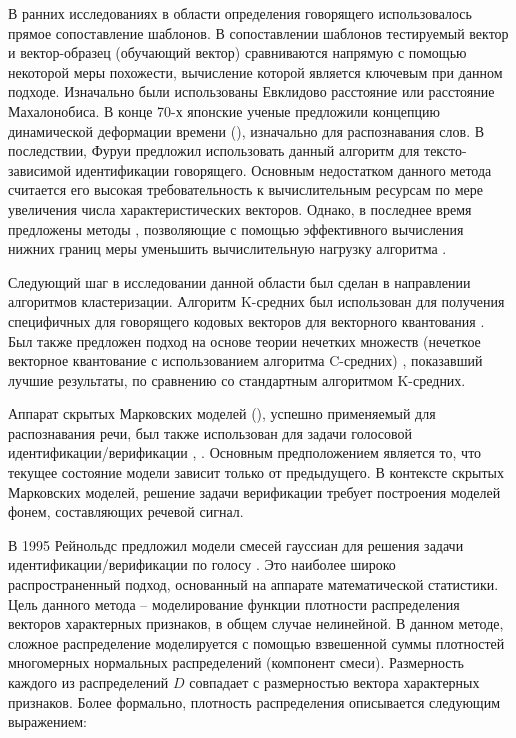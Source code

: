 В ранних исследованиях в области определения говорящего использовалось прямое сопоставление шаблонов. В сопоставлении шаблонов тестируемый вектор и вектор-образец (обучающий вектор) сравниваются напрямую с помощью некоторой меры похожести, вычисление которой является ключевым при данном подходе. Изначально были использованы Евклидово расстояние или расстояние Махалонобиса. В конце 70-х японские ученые предложили \cite{Sakoe78DTW} концепцию динамической деформации времени (), изначально для распознавания слов. В последствии, Фуруи \cite{Furui81cepstral} предложил использовать данный алгоритм для тексто-зависимой идентификации говорящего. Основным недостатком данного метода считается его высокая требовательность к вычислительным ресурсам по мере увеличения числа характеристических векторов. Однако, в последнее время предложены методы \cite{Lemire09dtw}, позволяющие с помощью эффективного вычисления нижних границ меры уменьшить вычислительную нагрузку алгоритма .

Следующий шаг в исследовании данной области был сделан в направлении алгоритмов кластеризации. Алгоритм K-средних был использован для получения специфичных для говорящего кодовых векторов для векторного квантования \cite{Soong85VQ}. Был также предложен подход на основе теории нечетких множеств (нечеткое векторное квантование с использованием алгоритма C-средних) \cite{Bezdek78FVQ}, показавший лучшие результаты, по сравнению со стандартным алгоритмом K-средних.

Аппарат скрытых Марковских моделей (), успешно применяемый для распознавания речи, был также использован для задачи голосовой идентификации/верификации \cite{Olsson02hmmann}, \cite{Falavigna_comparisonof}. Основным предположением является то, что текущее состояние модели зависит только от предыдущего. В контексте скрытых Марковских моделей, решение задачи верификации требует построения моделей фонем, составляющих речевой сигнал.

В 1995 Рейнольдс предложил модели смесей гауссиан для решения задачи идентификации/верификации по голосу \cite{Reynolds95gmm}. Это наиболее широко распространенный подход, основанный на аппарате математической статистики. Цель данного метода -- моделирование функции плотности распределения векторов характерных признаков, в общем случае нелинейной. В данном методе, сложное распределение моделируется с помощью взвешенной суммы плотностей многомерных нормальных распределений (компонент смеси). Размерность каждого из распределений $D$ совпадает с размерностью вектора характерных признаков. Более формально, плотность распределения описывается следующим выражением:

